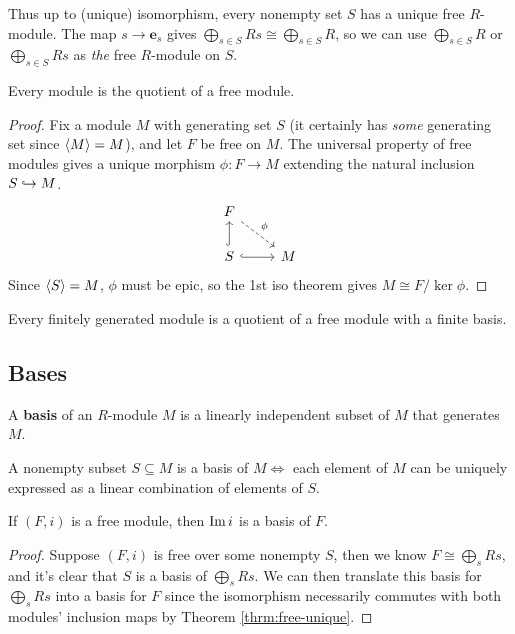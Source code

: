 \documentclass[twoside,10pt]{report}
\begin{document}
\begin{note}[]
	Thus up to (unique) isomorphism, every nonempty set $S$ has a unique free $R$-module. The map $s\to \mathbf{e}_{s}$ gives $\bigoplus_{s \in S}Rs \cong \bigoplus_{s \in S}R$, so we can use $\bigoplus_{s \in S}R$ or $\bigoplus_{s \in S}Rs$ as \textit{the} free $R$-module on $S$.
\end{note}

\begin{thrm}[]
Every module is the quotient of a free module.
\end{thrm}
\begin{proof}
	Fix a module $M$ with generating set $S$ (it certainly has \textit{some} generating set since $\langle M \rangle=M$), and let $F$ be free on $M$. The universal property of free modules gives a unique morphism $\phi:F\to M$ extending the natural inclusion $S \hookrightarrow M$.
	\[
	\begin{tikzcd}
		F \arrow[dr,dashed,"\phi"] \\
		S \uar[hook] \rar[hook] & M
	\end{tikzcd}
	\] Since $\langle S \rangle=M$, $\phi$ must be epic, so the 1st iso theorem gives $M \cong F / \ker \phi$.
\end{proof}

\begin{cor}
	Every finitely generated module is a quotient of a free module with a finite basis.
\end{cor}

\subsection{Bases}

\begin{defn}[]
A \textbf{basis} of an $R$-module $M$ is a linearly independent subset of $M$ that generates $M$.
\end{defn}

\begin{thrm}[]
A nonempty subset $S \subseteq M$ is a basis of $M \iff$ each element of $M$ can be uniquely expressed as a linear combination of elements of $S$.
\end{thrm}

\begin{prop}
	If $(F,i)$ is a free module, then $\operatorname{Im} i$ is a basis of $F$.
\end{prop}
\begin{proof}
	Suppose $(F,i)$ is free over some nonempty $S$, then we know $F \cong \bigoplus_{s}Rs$, and it's clear that $S$ is a basis of $\bigoplus_{s}Rs$. We can then translate this basis for $\bigoplus_{s}Rs$ into a basis for $F$ since the isomorphism necessarily commutes with both modules' inclusion maps by Theorem \ref{thrm:free-unique}.
\end{proof}
\end{document}
